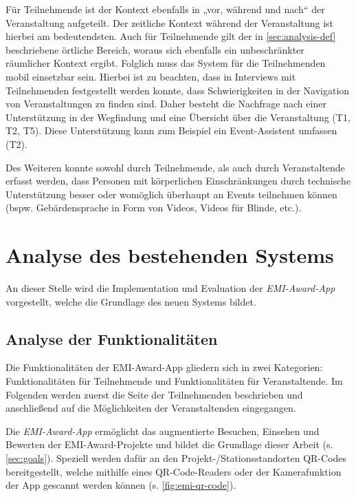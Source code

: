 Für Teilnehmende ist der Kontext ebenfalls in „vor, während und nach“ der
Veranstaltung aufgeteilt. Der zeitliche Kontext während der Veranstaltung ist
hierbei am bedeutendsten. Auch für Teilnehmende gilt der in
\autoref{sec:analysis-def} beschriebene örtliche Bereich, woraus sich ebenfalls
ein unbeschränkter räumlicher Kontext ergibt. Folglich muss das System für die
Teilnehmenden mobil einsetzbar sein. Hierbei ist zu beachten, dass in Interviews
mit Teilnehmenden festgestellt werden konnte, dass Schwierigkeiten in der
Navigation von Veranstaltungen zu finden sind. Daher besteht die Nachfrage nach
einer Unterstützung in der Wegfindung und eine Übersicht über die Veranstaltung
(T1, T2, T5). Diese Unterstützung kann zum Beispiel ein Event-Assistent umfassen
(T2).

Des Weiteren konnte sowohl durch Teilnehmende, als auch durch Veranstaltende
erfasst werden, dass Personen mit körperlichen Einschränkungen durch technische
Unterstützung besser oder womöglich überhaupt an Events teilnehmen können (bspw.
Gebärdensprache in Form von Videos, Videos für Blinde, etc.).

\section{Analyse des bestehenden Systems} \label{sec:analysis-old}

An dieser Stelle wird die Implementation und Evaluation der
\textit{EMI-Award-App} vorgestellt, welche die Grundlage des neuen Systems bildet.



\subsection{Analyse der Funktionalitäten} \label{ssec:analysis-old-funk}

Die Funktionalitäten der EMI-Award-App gliedern sich in zwei Kategorien:
Funktionalitäten für Teilnehmende und Funktionalitäten für Veranstaltende.
Im Folgenden werden zuerst die Seite der Teilnehmenden beschrieben und
anschließend auf die Möglichkeiten der Veranstaltenden eingegangen.

Die \textit{EMI-Award-App} ermöglicht das augmentierte Besuchen, Einsehen und
Bewerten der EMI-Award-Projekte und bildet die Grundlage dieser Arbeit (s.
\autoref{sec:goals}). Speziell werden dafür an den Projekt-/Stationsstandorten
QR-Codes bereitgestellt, welche mithilfe eines QR-Code-Readers oder der
Kamerafunktion der App gescannt werden können (s. \autoref{fig:emi-qr-code}).

